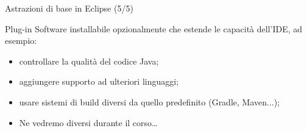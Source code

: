 \documentclass[presentation]{beamer}
\begin{document}
\begin{frame}{Astrazioni di base in Eclipse (5/5)}
\begin{block}{Plug-in}
Software installabile opzionalmente che estende le capacità dell'IDE, ad esempio:
\begin{itemize}
\item controllare la qualità del codice Java;
\item aggiungere supporto ad ulteriori linguaggi;
\item usare sistemi di build diversi da quello predefinito (Gradle, Maven...);
\end{itemize}
\end{block}

\begin{itemize}
\item Ne vedremo diversi durante il corso\dots
\end{itemize}
\end{frame}
\end{document}

